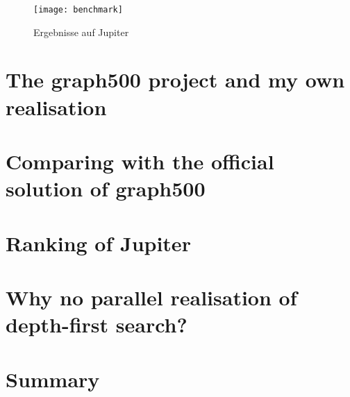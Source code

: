 \documentclass[11pt,a4paper]{article}
\begin{document}
\begin{figure}[htbp]
	\centering
	\texttt{[image: benchmark]}%
	\caption{Ergebnisse auf Jupiter}%
	\label{fig:benchmark}
\end{figure}

\section{The graph500 project and my own realisation}
\label{sec:graph500}

\section{Comparing with the official solution of graph500}
\label{sec:Comparing}

\section{Ranking of Jupiter}
\label{sec:ranking}

\section{Why no parallel realisation of depth-first search?}
\label{sec:depth-first search}

\section{Summary}
\label{sec:summary}

\clearpage



\end{document}
